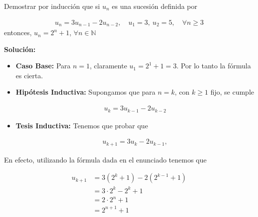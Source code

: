 \documentclass[12pt]{book}
\begin{document}
\begin{prob}{}{}
Demostrar por inducción que si $u_n$ es una sucesión definida por 

\begin{align*}
    u_n=3u_{n-1}-2u_{n-2}, \quad u_1=3, \ u_2=5, \quad \forall n \geq 3
\end{align*}
entonces, $u_n=2^n+1$, $\forall n \in \mathbb{N}$
\end{prob}
\textbf{Solución:}
\begin{itemize}
    \item \textbf{Caso Base:} Para $n=1$, claramente $u_1=2^1+1=3$. Por lo tanto la fórmula es cierta.

    \item \textbf{Hipótesis Inductiva:} Supongamos que para $n=k$, con $k\geq 1 $ fijo, se cumple 

    \begin{align*}
           u_k=3u_{k-1}-2u_{k-2}
    \end{align*}

    \item \textbf{Tesis Inductiva:} Tenemos que probar que 

    \begin{align*}
        u_{k+1}=3u_{k}-2u_{k-1}, 
    \end{align*}
\end{itemize}
En efecto, utilizando la fórmula dada en el enunciado tenemos que 

\begin{align*}
    u_{k+1}&=3(2^k+1)-2(2^{k-1}+1) \\
    &=3\cdot 2^k-2^k+1 \\
    &=2\cdot 2^n+1 \\
    &=2^{n+1}+1
\end{align*}
\end{document}
